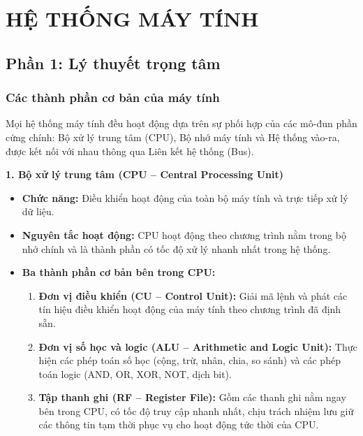 \chapter{HỆ THỐNG MÁY TÍNH}

\section{Phần 1: Lý thuyết trọng tâm}

\subsection{Các thành phần cơ bản của máy tính}

Mọi hệ thống máy tính đều hoạt động dựa trên sự phối hợp của các mô-đun phần cứng chính: Bộ xử lý trung tâm (CPU), Bộ nhớ máy tính và Hệ thống vào-ra, được kết nối với nhau thông qua Liên kết hệ thống (Bus).

\textbf{1. Bộ xử lý trung tâm (CPU -- Central Processing Unit)}
\begin{itemize}
    \item \textbf{Chức năng:} Điều khiển hoạt động của toàn bộ máy tính và trực tiếp xử lý dữ liệu.
    \item \textbf{Nguyên tắc hoạt động:} CPU hoạt động theo chương trình nằm trong bộ nhớ chính và là thành phần có tốc độ xử lý nhanh nhất trong hệ thống.
    \item \textbf{Ba thành phần cơ bản bên trong CPU:}
    \begin{enumerate}
        \item \textbf{Đơn vị điều khiển (CU -- Control Unit):} Giải mã lệnh và phát các tín hiệu điều khiển hoạt động của máy tính theo chương trình đã định sẵn.
        \item \textbf{Đơn vị số học và logic (ALU -- Arithmetic and Logic Unit):} Thực hiện các phép toán số học (cộng, trừ, nhân, chia, so sánh) và các phép toán logic (AND, OR, XOR, NOT, dịch bit).
        \item \textbf{Tập thanh ghi (RF -- Register File):} Gồm các thanh ghi nằm ngay bên trong CPU, có tốc độ truy cập nhanh nhất, chịu trách nhiệm lưu giữ các thông tin tạm thời phục vụ cho hoạt động tức thời của CPU.
    \end{enumerate}
\end{itemize}

